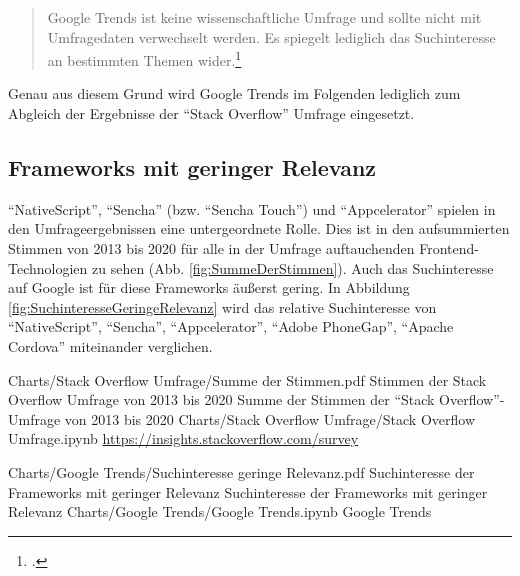 \begin{quotation}
Google Trends ist keine wissenschaftliche Umfrage und sollte nicht mit Umfragedaten verwechselt werden.
Es spiegelt lediglich das Suchinteresse an bestimmten Themen wider.\footcite{GoogleTrendsHilfe}
\end{quotation}

Genau aus diesem Grund wird Google Trends im Folgenden lediglich zum Abgleich der Ergebnisse der \enquote{Stack Overflow} Umfrage eingesetzt.

\subsection{Frameworks mit geringer Relevanz}

\enquote{NativeScript}, \enquote{Sencha} (bzw.
\enquote{Sencha Touch}) und \enquote{Appcelerator} spielen in den Umfrageergebnissen eine untergeordnete Rolle.
Dies ist in den aufsummierten Stimmen von 2013 bis 2020 für alle in der Umfrage auftauchenden Frontend-Technologien zu sehen (Abb.
\ref{fig:SummeDerStimmen}).
Auch das Suchinteresse auf Google ist für diese Frameworks äußerst gering. 
In Abbildung \ref{fig:SuchinteresseGeringeRelevanz} wird das relative Suchinteresse von \enquote{NativeScript}, \enquote{Sencha}, \enquote{Appcelerator}, \enquote{Adobe PhoneGap}, \enquote{Apache Cordova} miteinander verglichen.


\begin{alexfigurewithnotebook}{Charts/Stack Overflow Umfrage/Summe der Stimmen.pdf}
	{Stimmen der Stack Overflow Umfrage von 2013 bis 2020}
	{Summe der Stimmen der \enquote{Stack Overflow}-Umfrage von 2013 bis 2020}
	{Charts/Stack Overflow Umfrage/Stack Overflow Umfrage.ipynb}
	{\url{https://insights.stackoverflow.com/survey}}

	\label{fig:SummeDerStimmen}

\end{alexfigurewithnotebook}
\begin{alexfigurewithnotebook}{Charts/Google Trends/Suchinteresse geringe Relevanz.pdf}
	{Suchinteresse der Frameworks mit geringer Relevanz}
	{Suchinteresse der Frameworks mit geringer Relevanz}
	{Charts/Google Trends/Google Trends.ipynb}
	{Google Trends}
	\label{fig:SuchinteresseGeringeRelevanz}

\end{alexfigurewithnotebook} 
\clearpage




